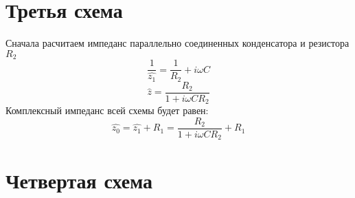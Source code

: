 \section{Третья схема}
\begin{center}

\end{center}
Сначала расчитаем импеданс параллельно соединенных конденсатора и резистора $R_2$
\begin{equation}
	\frac{1}{\hat{z_1}}=\frac{1}{R_2}+i\omega C
	\end{equation}
	\begin{equation}
		\hat{z}=\frac{R_2}{1+i \omega CR_2}
	\end{equation}
	Комплексный импеданс всей схемы будет равен:
	\begin{equation}
		\hat{z_0}=\hat{z_1}+R_1=\frac{R_2}{1+i \omega CR_2}+R_1
	\end{equation}


\section{Четвертая схема}
	


